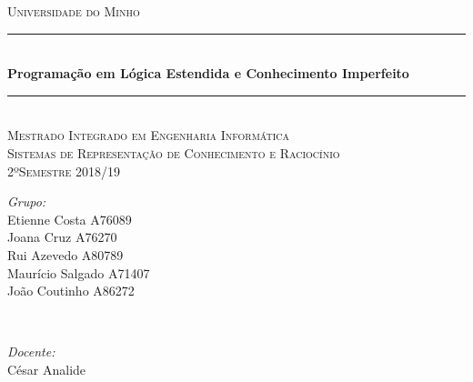 \documentclass[25pt]{article}
\begin{document}
\begin{titlepage}

\newcommand{\HRule}{\rule{\linewidth}{0.5mm}} %

\center %


\textsc{\LARGE Universidade do Minho}\\[1.5cm]
\HRule \\[0.4cm]
{ \huge \bfseries Programação em Lógica Estendida e Conhecimento Imperfeito}\\[0.4cm]
\HRule \\[1.5cm]
\textsc{\Large Mestrado Integrado em Engenharia Informática}\\[0.5cm]
\textsc{\large Sistemas de Representação de Conhecimento e Raciocínio}\\[0.5cm]
\textsc{\large 2ºSemestre 2018/19}\\[0.5cm]



\begin{minipage}{0.4\textwidth}
\begin{flushleft} \large
\emph{Grupo:}\\
Etienne Costa A76089 \\
Joana Cruz A76270 \\
Rui Azevedo A80789 \\
Maurício Salgado A71407 \\
João Coutinho A86272 \\
\end{flushleft}
\end{minipage}
~
\begin{minipage}{0.4\textwidth}
\begin{flushright} \large
\emph{Docente:} \\
César Analide\\
\end{flushright}
\end{minipage}\\[2cm]



\end{titlepage}
\end{document}

